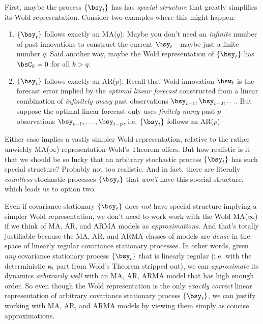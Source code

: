 \documentclass[12pt]{article}
\theoremstyle{plain}
\theoremstyle{definition}
\theoremstyle{remark}
\newcommand{\bskappa}{\boldsymbol{\kappa}}
\begin{document}
First, maybe the process $\{\bsy_t\}$ has has \emph{special structure}
that greatly simplifies its Wold representation.
Consider two examples where this might happen:
\begin{enumerate}
  \item $\{\bsy_t\}$ follows exactly an MA($q$):
    Maybe you don't need an \emph{infinite} number of past innovations
    to construct the current $\bsy_t$---maybe just a finite number $q$.
    Said another way, maybe the Wold representation of $\{\bsy_t\}$ has
    $\bsC_k=0$ for all $k>q$.
  \item $\{\bsy_t\}$ follows exactly an AR($p$):
    Recall that Wold innovation $\bsw_t$ is the forecast error implied
    by the \emph{optimal linear forecast} constructed from a linear
    combination of \emph{infinitely many} past observations
    $\bsy_{t-1},\bsy_{t-2},\ldots$.
    But suppose the optimal linear forecast only uses
    \emph{finitely many} past $p$ observations
    $\bsy_{t-1},\ldots,\bsy_{t-p}$, i.e. $\{\bsy_t\}$ follows an AR($p$)
\end{enumerate}
Either case implies a vastly simpler Wold representation, relative to the
rather unwieldy MA($\infty$) representation Wold's Theorem offers.
But how realistic is it that we should be so lucky that an arbitrary
stochastic process $\{\bsy_t\}$ has such special structure?  Probably
not too realistic.
And in fact, there are literally \emph{countless} stochastic processes
$\{\bsy_t\}$ that \emph{won't} have this special structure, which leads
us to option two.

Even if covariance stationary $\{\bsy_t\}$ does \emph{not} have special
structure implying a simpler Wold representation, we don't need to work
work with the Wold MA($\infty$) if we think of MA, AR, and ARMA models
as \emph{approximations}.
And that's totally justifiable because the MA, AR, and ARMA classes of
models are \emph{dense} in the space of linearly regular covariance
stationary processes. In other words, given \emph{any} covariance
stationary process $\{\bsy_t\}$ that is linearly regular (i.e. with the
deterministic $\bskappa_t$ part from Wold's Theorem stripped out),
we can \emph{approximate} its dynamics \emph{arbitrarily well} with an
MA, AR, ARMA model that has high enough order.
So even though the Wold representation is the only \emph{exactly
correct} linear representation of arbitrary covariance stationary
process $\{\bsy_t\}$, we can justify working with MA, AR, and
ARMA models by viewing them simply as concise approximations.
\end{document}
